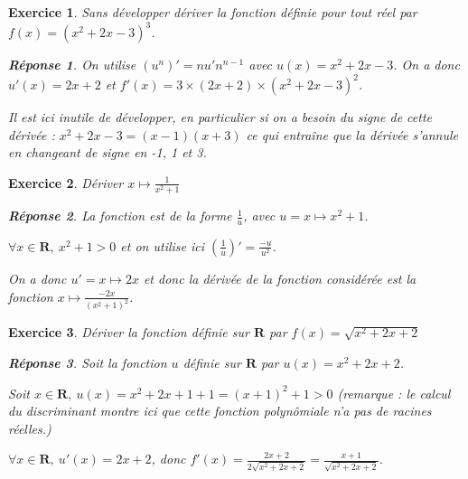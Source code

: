\documentclass[a4paper,12pt,french]{article}
\theoremstyle{break}
\newtheorem{exercice}{Exercice}
\theoremstyle{nonumberplain}
\newtheorem{reponse}{Réponse}
\newcommand{\R}{\mathbf{R}}
\begin{document}
\begin{exercice}
  Sans développer dériver la fonction définie pour tout réel par
  $f(x)=(x^2 + 2x -3)^3$.

  \begin{reponse}
    On utilise $(u^n)' = nu'n^{n-1}$ avec $u(x) = x^2 + 2x - 3$. On a
    donc $u'(x) = 2x + 2$ et $f'(x) = 3\times(2x + 2)\times(x^2 + 2x
    -3)^2$.

    Il est ici inutile de développer, en particulier si on a besoin du
    signe de cette dérivée : $x^2 + 2x -3 = (x-1)(x+3)$ ce qui entraîne
    que la dérivée s'annule en changeant de signe en -1, 1 et 3.
  \end{reponse}
\end{exercice}

\begin{exercice}
  Dériver $x\mapsto \frac1{x^2 +1}$
  \begin{reponse}
    La fonction est de la forme $\frac1u$, avec $u = x\mapsto x^2 + 1$.

    $\forall x\in \R,\ x^2 + 1 > 0$ et on utilise ici $\left( \frac1u
    \right)' = \frac{-u}{u^2}$.

    On a donc $u' = x\mapsto 2x$ et donc la dérivée de la fonction
    considérée est la fonction $x \mapsto \frac{-2x}{(x^2 +1)^2}$.
  \end{reponse}
\end{exercice}

\begin{exercice}
  Dériver la fonction définie sur $\R$ par $f(x) = \sqrt{x^2 + 2x + 2}$
  \begin{reponse}
    Soit la fonction $u$ définie sur $\R$ par $u(x) = x^2 + 2x + 2$.

    Soit $x\in \R,\ u(x) = x^2 + 2x + 1 +1 = (x+1)^2 + 1 > 0$ (remarque
    : le calcul du discriminant montre ici que cette fonction
    polynômiale n'a pas de racines réelles.)

    $\forall x\in\R,\ u'(x) = 2x + 2$, donc $f'(x) = \frac{2x +
    2}{2\sqrt{x^2 + 2x + 2}} = \frac{x + 1}{\sqrt{x^2 + 2x + 2}}$.
  \end{reponse}
\end{exercice}
\end{document}
